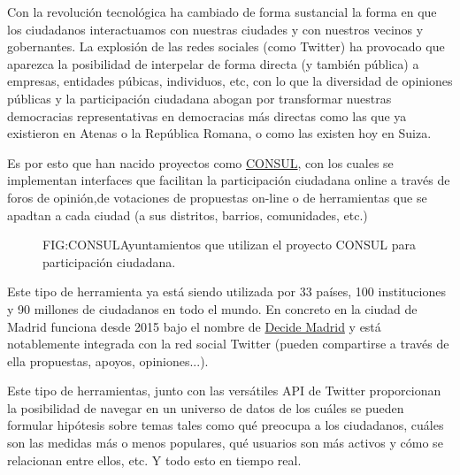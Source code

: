 Con la revolución tecnológica ha cambiado de forma sustancial la forma en que los ciudadanos interactuamos con nuestras ciudades y con nuestros vecinos y gobernantes. La explosión de las redes sociales (como Twitter) ha provocado que aparezca la posibilidad de interpelar de forma directa (y también pública) a empresas, entidades púbicas, individuos, etc, con lo que la diversidad de opiniones públicas y la participación ciudadana abogan por transformar nuestras democracias representativas en democracias más directas como las que ya existieron en Atenas o la República Romana, o como las existen hoy en Suiza.

Es por esto que han nacido proyectos como \href{http://consulproject.org/en/}{CONSUL}, con los cuales se implementan interfaces que facilitan la participación ciudadana online a través de foros de opinión,de votaciones de propuestas on-line o de herramientas que se apadtan a cada ciudad (a sus distritos, barrios, comunidades, etc.) 

\begin{figure}[CONSUL en España y el mundo]{FIG:CONSUL}{Ayuntamientos que utilizan el proyecto CONSUL para participación ciudadana.}
	 \quad
\end{figure}

Este tipo de herramienta ya está siendo utilizada por 33 países, 100 instituciones y 90 millones de ciudadanos en todo el mundo. En concreto en la ciudad de Madrid funciona desde 2015 bajo el nombre de \href{https://decide.madrid.es/}{Decide Madrid} y está notablemente integrada con la red social Twitter (pueden compartirse  a través de ella propuestas, apoyos, opiniones...).

Este tipo de herramientas, junto con las versátiles API de Twitter proporcionan la posibilidad de navegar en un universo de datos de los cuáles se pueden formular hipótesis sobre temas tales como qué preocupa a los ciudadanos, cuáles son las medidas más o menos populares, qué usuarios son más activos y cómo se relacionan entre ellos, etc. Y todo esto en tiempo real.

